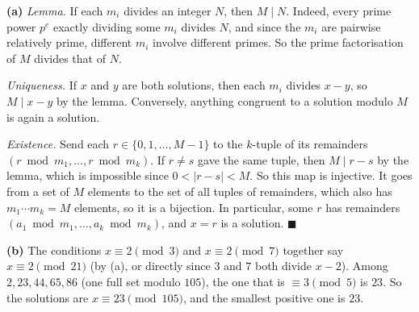 \textbf{(a)} \emph{Lemma.} If each $m_i$ divides an integer $N$, then $M\mid N$. Indeed, every prime power $p^e$ exactly dividing some $m_i$ divides $N$, and since the $m_i$ are pairwise relatively prime, different $m_i$ involve different primes. So the prime factorisation of $M$ divides that of $N$.

\emph{Uniqueness.} If $x$ and $y$ are both solutions, then each $m_i$ divides $x-y$, so $M\mid x-y$ by the lemma. Conversely, anything congruent to a solution modulo $M$ is again a solution.

\emph{Existence.} Send each $r\in\{0,1,\dots,M-1\}$ to the $k$-tuple of its remainders $\left(r\bmod m_1,\dots,r\bmod m_k\right)$. If $r\ne s$ gave the same tuple, then $M\mid r-s$ by the lemma, which is impossible since $0<|r-s|<M$. So this map is injective. It goes from a set of $M$ elements to the set of all tuples of remainders, which also has $m_1\cdots m_k=M$ elements, so it is a bijection. In particular, some $r$ has remainders $\left(a_1\bmod m_1,\dots,a_k\bmod m_k\right)$, and $x=r$ is a solution. $\blacksquare$

\textbf{(b)} The conditions $x\equiv2\pmod3$ and $x\equiv2\pmod7$ together say $x\equiv2\pmod{21}$ (by (a), or directly since $3$ and $7$ both divide $x-2$). Among $2,23,44,65,86$ (one full set modulo $105$), the one that is $\equiv3\pmod5$ is $23$. So the solutions are $x\equiv23\pmod{105}$, and the smallest positive one is $\boxed{23}$.
